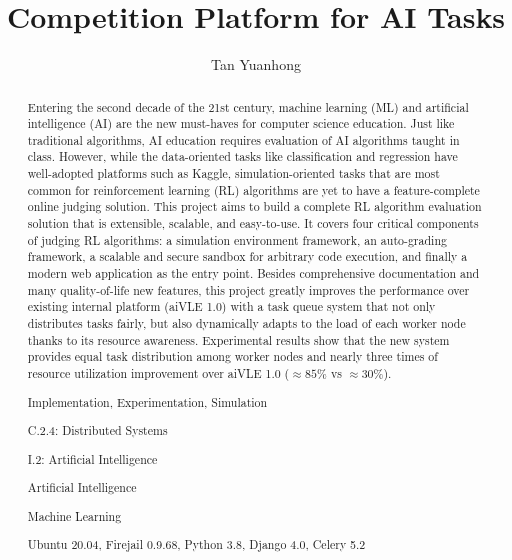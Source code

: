 \documentclass[fyp]{socreport}
\begin{document}
\title{Competition Platform for AI Tasks}
\author{Tan Yuanhong}
\maketitle
\begin{abstract}
Entering the second decade of the 21st century, machine learning (ML) and artificial intelligence (AI) are the new must-haves for computer science education. Just like traditional algorithms, AI education requires evaluation of AI algorithms taught in class. However, while the data-oriented tasks like classification and regression have well-adopted platforms such as Kaggle, simulation-oriented tasks that are most common for reinforcement learning (RL) algorithms are yet to have a feature-complete online judging solution. This project aims to build a complete RL algorithm evaluation solution that is extensible, scalable, and easy-to-use. It covers four critical components of judging RL algorithms: a simulation environment framework, an auto-grading framework, a scalable and secure sandbox for arbitrary code execution, and finally a modern web application as the entry point. Besides comprehensive documentation and many quality-of-life new features, this project greatly improves the performance over existing internal platform (aiVLE 1.0) with a task queue system that not only distributes tasks fairly, but also dynamically adapts to the load of each worker node thanks to its resource awareness. Experimental results show that the new system provides equal task distribution among worker nodes and nearly three times of resource utilization improvement over aiVLE 1.0 ($\approx 85\%$ vs $\approx 30\%$).

\begin{project-nature}
	Implementation, Experimentation, Simulation
\end{project-nature}
\begin{subject-descriptor}
    \item C.2.4: Distributed Systems
    \item I.2: Artificial Intelligence
\end{subject-descriptor}
\begin{keywords}
    \item Artificial Intelligence
	\item Machine Learning
\end{keywords}
\begin{implement}
	Ubuntu 20.04, Firejail 0.9.68, Python 3.8, Django 4.0, Celery 5.2
\end{implement}

\end{abstract}
\end{document}
